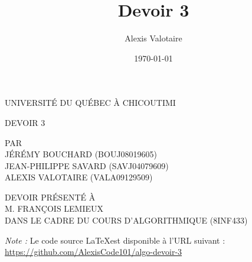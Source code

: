 \documentclass[12pt]{article}
\title{Devoir 3}
\author{Alexis Valotaire}
\date{\today}
\begin{document}
\begin{titlepage}
	\doublespacing
	\centering

	UNIVERSITÉ DU QUÉBEC À CHICOUTIMI \\

	\vspace{4.7cm}

	DEVOIR 3 \\

	\vspace{4.7cm}

	PAR \\
	JÉRÉMY BOUCHARD (BOUJ08019605) \\
	JEAN-PHILIPPE SAVARD (SAVJ04079609) \\
	ALEXIS VALOTAIRE (VALA09129509) \\

	\vspace{4.7cm}

	DEVOIR PRÉSENTÉ À \\
	M. FRANÇOIS LEMIEUX \\
	DANS LE CADRE DU COURS D'ALGORITHMIQUE (8INF433)
\end{titlepage}

\newpage

\textit{Note :} Le code source \LaTeX \:est disponible à l'URL suivant : \\
\url{https://github.com/AlexisCode101/algo-devoir-3}

\newpage

\onehalfspacing


 
\newpage



\newpage



\newpage


\end{document}
